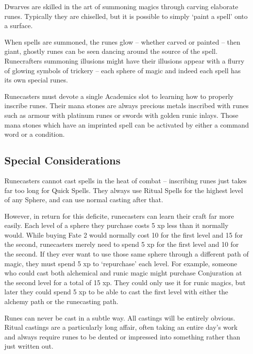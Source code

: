 \documentclass[titlepage,a4paper,openany]{book}
\begin{document}
\begin{multicols}{2}

\noindent Dwarves are skilled in the art of summoning magics through carving elaborate runes. Typically they are chiselled, but it is possible to simply `paint a spell' onto a surface.

When spells are summoned, the runes glow -- whether carved or painted -- then giant, ghostly runes can be seen dancing around the source of the spell. Runecrafters summoning illusions might have their illusions appear with a flurry of glowing symbols of trickery -- each sphere of magic and indeed each spell has its own special runes.

Runecasters must devote a single Academics slot to learning how to properly inscribe runes. Their mana stones are always precious metals inscribed with runes such as armour with platinum runes or swords with golden runic inlays. Those mana stones which have an imprinted spell can be activated by either a command word or a condition.

\subsection{Special Considerations}

Runecasters cannot cast spells in the heat of combat -- inscribing runes just takes far too long for Quick Spells. They always use Ritual Spells for the highest level of any Sphere, and can use normal casting after that.

However, in return for this deficite, runecasters can learn their craft far more easily. Each level of a sphere they purchase costs 5 \gls{xp} less than it normally would. While buying Fate 2 would normally cost 10 for the first level and 15 for the second, runecasters merely need to spend 5 \gls{xp} for the first level and 10 for the second. If they ever want to use those same sphere through a different path of magic, they must spend 5 \gls{xp} to `repurchase' each level. For example, someone who could cast both alchemical and runic magic might purchase Conjuration at the second level for a total of 15 \gls{xp}. They could only use it for runic magics, but later they could spend 5 \gls{xp} to be able to cast the first level with either the alchemy path or the runecasting path.

Runes can never be cast in a subtle way. All castings will be entirely obvious. Ritual castings are a particularly long affair, often taking an entire day's work and always require runes to be dented or impressed into something rather than just written out.


\end{multicols}
\end{document}
